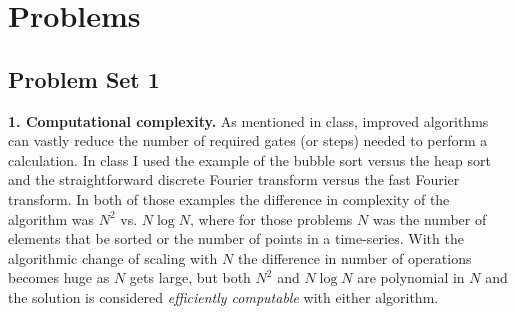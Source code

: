 \documentclass{book}
\theoremstyle{definition}
\begin{document}
%















\chapter{Problems}

\newpage

\section{Problem Set 1}



\noindent \textbf{1. Computational complexity.}  As mentioned in class, improved algorithms can vastly reduce
the number of required gates (or steps) needed to perform a calculation. In class I used the
example of the bubble sort versus the heap sort and the straightforward discrete Fourier
transform versus the fast Fourier transform. In both of those examples the difference in
complexity of the algorithm was $N^2$ vs. $N \log N$, where for those problems $N$ was the number
of elements that be sorted or the number of points in a time-series. With the algorithmic
change of scaling with $N$ the difference in number of operations becomes huge as $N$ gets
large, but both $N^2$ and $N \log N$ are polynomial in $N$ and the solution is considered \textit{efficiently
computable} with either algorithm.
\\
\end{document}

